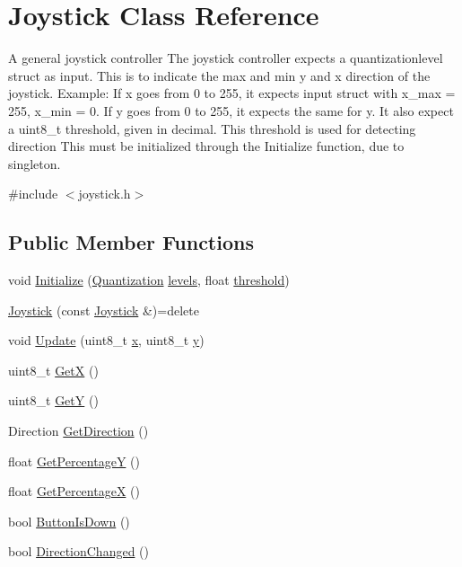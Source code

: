 \hypertarget{class_joystick}{}\section{Joystick Class Reference}
\label{class_joystick}


A general joystick controller The joystick controller expects a quantizationlevel struct as input. This is to indicate the max and min y and x direction of the joystick. Example\+: If x goes from 0 to 255, it expects input struct with x\+\_\+max = 255, x\+\_\+min = 0. If y goes from 0 to 255, it expects the same for y. It also expect a uint8\+\_\+t threshold, given in decimal. This threshold is used for detecting direction This must be initialized through the Initialize function, due to singleton.  




{\ttfamily \#include $<$joystick.\+h$>$}

\subsection*{Public Member Functions}
\begin{DoxyCompactItemize}
\item 
void \hyperlink{class_joystick_a81ab2867d039ed9c974ee56c10063d8e}{Initialize} (\hyperlink{struct_quantization}{Quantization} \hyperlink{class_joystick_ae60f2daf5c456900e821b2fde565ef38}{levels}, float \hyperlink{class_joystick_a30b68bce5589674148d43b4854b25cef}{threshold})
\item 
\hyperlink{class_joystick_a93a3cb5bc4d4ea7c94709b8730257f13}{Joystick} (const \hyperlink{class_joystick}{Joystick} \&)=delete
\item 
void \hyperlink{class_joystick_a07571eca717b70b094f9aa42d90bced7}{Update} (uint8\+\_\+t \hyperlink{class_joystick_abeb4f1563a57266700a48ba5aa49b4cd}{x}, uint8\+\_\+t \hyperlink{class_joystick_a691b70ed215adf414e0ab4edba5407a2}{y})
\item 
uint8\+\_\+t \hyperlink{class_joystick_ae578e9c06313f37a53c3b0c4e0ca014d}{GetX} ()
\item 
uint8\+\_\+t \hyperlink{class_joystick_a849ffb99289dcb3186e532fd1115cf46}{GetY} ()
\item 
Direction \hyperlink{class_joystick_a8a8ad3f735c9e3e3a0bbd9ac0e73f4cc}{Get\+Direction} ()
\item 
float \hyperlink{class_joystick_af774eede094927838113b9ff3a8252bb}{Get\+PercentageY} ()
\item 
float \hyperlink{class_joystick_a661653de4d298a9dccf316b1768206ea}{Get\+PercentageX} ()
\item 
bool \hyperlink{class_joystick_a35c4969f04f76a83860d9adf6ca3adba}{Button\+Is\+Down} ()
\item 
bool \hyperlink{class_joystick_ac905c75bcfe0701d3f2005d0c424cef3}{Direction\+Changed} ()
\end{DoxyCompactItemize}
